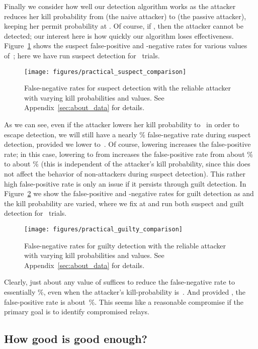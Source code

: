 \documentclass[]{lmcs}
\begin{document}
Finally we consider how well our detection algorithm works as the
attacker reduces her kill probability from  (the naive attacker)
to  (the passive attacker), keeping her permit probability
at .  Of course, if , then the attacker cannot
be detected; our interest here is how quickly our algorithm loses
effectiveness.
Figure~\ref{fig:suspect_fp_fn_rates} shows the suspect
false-positive and -negative rates for various values of~; here
we have run suspect detection for~ trials.
\begin{figure}
\begin{center}
\texttt{[image: figures/practical\_suspect\_comparison]}
\end{center}
\caption{False-negative rates for suspect detection with
the reliable attacker with varying kill probabilities and  values.
See Appendix~\ref{sec:about_data} for details.}
\label{fig:suspect_fp_fn_rates}
\end{figure}
As we can see, even if the attacker lowers her kill probability 
to~ in order to escape detection, we will still have a nearly \%
false-negative rate during suspect detection, provided we lower 
to~.  Of course, lowering  increases the
false-positive rate; in this case, lowering to  from 
increases the false-positive rate from about \% to about \%
(this is independent of the attacker's kill probability, since this does
not affect the behavior of non-attackers during suspect detection).
This rather high false-positive rate is only an issue if it
persists through guilt detection.  In 
Figure~\ref{fig:practical_guilty_comparison}
we show the false-positive and -negative rates for guilt detection as 
and the kill probability are varied, where we fix
 at  and run both suspect and guilt detection for~ trials.
\begin{figure}
\begin{center}
\texttt{[image: figures/practical\_guilty\_comparison]}
\end{center}
\caption{False-negative rates for guilty detection with
the reliable attacker with varying kill probabilities and  values.
See Appendix~\ref{sec:about_data} for details.}
\label{fig:practical_guilty_comparison}
\end{figure}
Clearly, just about any value of  suffices to reduce the
false-negative rate to essentially \%, even when the attacker's
kill-probability is~.  And provided , the false-positive
rate is about~\%.  
This seems like a reasonable compromise if the
primary goal is to identify compromised relays.  

\subsection{How good is good enough?}
\end{document}

